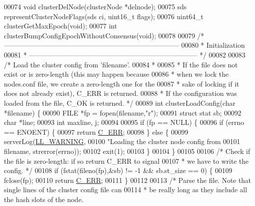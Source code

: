 \begin{DoxyCode}
00074 \textcolor{keywordtype}{void} clusterDelNode(clusterNode *delnode);
00075 sds representClusterNodeFlags(sds ci, uint16\_t flags);
00076 uint64\_t clusterGetMaxEpoch(\textcolor{keywordtype}{void});
00077 \textcolor{keywordtype}{int} clusterBumpConfigEpochWithoutConsensus(\textcolor{keywordtype}{void});
00078 
00079 \textcolor{comment}{/* -----------------------------------------------------------------------------}
00080 \textcolor{comment}{ * Initialization}
00081 \textcolor{comment}{ * -------------------------------------------------------------------------- */}
00082 
00083 \textcolor{comment}{/* Load the cluster config from 'filename'.}
00084 \textcolor{comment}{ *}
00085 \textcolor{comment}{ * If the file does not exist or is zero-length (this may happen because}
00086 \textcolor{comment}{ * when we lock the nodes.conf file, we create a zero-length one for the}
00087 \textcolor{comment}{ * sake of locking if it does not already exist), C\_ERR is returned.}
00088 \textcolor{comment}{ * If the configuration was loaded from the file, C\_OK is returned. */}
00089 \textcolor{keywordtype}{int} clusterLoadConfig(\textcolor{keywordtype}{char} *filename) \{
00090     FILE *fp = fopen(filename,\textcolor{stringliteral}{"r"});
00091     \textcolor{keyword}{struct} stat sb;
00092     \textcolor{keywordtype}{char} *line;
00093     \textcolor{keywordtype}{int} maxline, j;
00094 
00095     \textcolor{keywordflow}{if} (fp == NULL) \{
00096         \textcolor{keywordflow}{if} (errno == ENOENT) \{
00097             \textcolor{keywordflow}{return} \hyperlink{server_8h_af98ac28d5f4d23d7ed5985188e6fb7d1}{C\_ERR};
00098         \} \textcolor{keywordflow}{else} \{
00099             serverLog(\hyperlink{server_8h_a31229b9334bba7d6be2a72970967a14b}{LL\_WARNING},
00100                 \textcolor{stringliteral}{"Loading the cluster node config from %
00101                 filename, strerror(errno));
00102             exit(1);
00103         \}
00104     \}
00105 
00106     \textcolor{comment}{/* Check if the file is zero-length: if so return C\_ERR to signal}
00107 \textcolor{comment}{     * we have to write the config. */}
00108     \textcolor{keywordflow}{if} (fstat(fileno(fp),&sb) != -1 && sb.st\_size == 0) \{
00109         fclose(fp);
00110         \textcolor{keywordflow}{return} \hyperlink{server_8h_af98ac28d5f4d23d7ed5985188e6fb7d1}{C\_ERR};
00111     \}
00112 
00113     \textcolor{comment}{/* Parse the file. Note that single lines of the cluster config file can}
00114 \textcolor{comment}{     * be really long as they include all the hash slots of the node.}
}
\end{DoxyCode}
